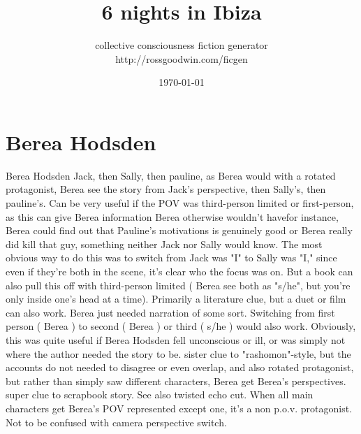 \documentclass[12pt]{book}
\title{6 nights in Ibiza}
\author{collective consciousness fiction generator\\http://rossgoodwin.com/ficgen}
\date{\today}
\begin{document}
\maketitle



\chapter{Berea Hodsden}

Berea Hodsden Jack, then Sally, then pauline, as Berea would with a rotated protagonist, Berea see the story from Jack's perspective, then Sally's, then pauline's. Can be very useful if the POV was third-person limited or first-person, as this can give Berea information Berea otherwise wouldn't havefor instance, Berea could find out that Pauline's motivations is genuinely good or Berea really did kill that guy, something neither Jack nor Sally would know. The most obvious way to do this was to switch from Jack was "I" to Sally was "I," since even if they're both in the scene, it's clear who the focus was on. But a book can also pull this off with third-person limited ( Berea see both as "s/he", but you're only inside one's head at a time). Primarily a literature clue, but a duet or film can also work. Berea just needed narration of some sort. Switching from first person ( Berea ) to second ( Berea ) or third ( s/he ) would also work. Obviously, this was quite useful if Berea Hodsden fell unconscious or ill, or was simply not where the author needed the story to be. sister clue to "rashomon"-style, but the accounts do not needed to disagree or even overlap, and also rotated protagonist, but rather than simply saw different characters, Berea get Berea's perspectives. super clue to scrapbook story. See also twisted echo cut. When all main characters get Berea's POV represented except one, it's a non p.o.v. protagonist. Not to be confused with camera perspective switch.
\end{document}
